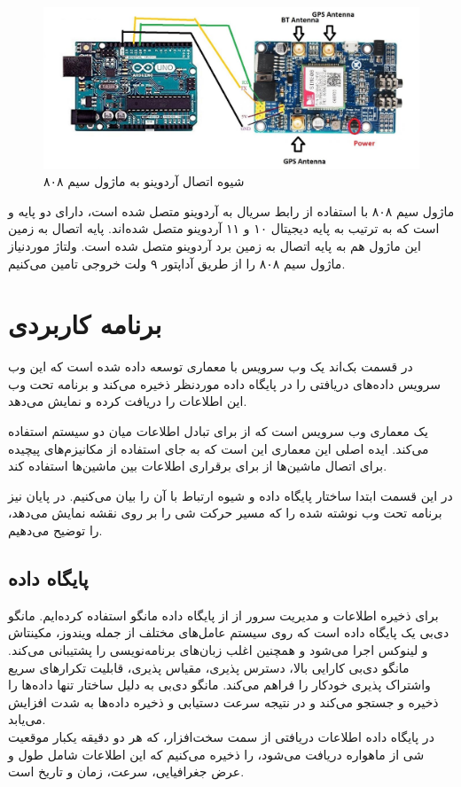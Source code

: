 \begin{figure}[!h]
	\centerline{\includegraphics[width=.8\textwidth]{sim808-arduino}}
	\caption{شیوه اتصال آردوینو به ماژول سیم ۸۰۸\cite{interface}}
\end{figure}


ماژول سیم ۸۰۸ با استفاده از رابط سریال به آردوینو متصل شده است، دارای دو پایه  و  است که به ترتیب به پایه دیجیتال ۱۰ و ۱۱ آردوینو متصل شده‌اند. پایه اتصال به زمین این ماژول هم به پایه اتصال به زمین برد آردوینو متصل شده است. ولتاژ موردنیاز ماژول سیم ۸۰۸ را از طریق آداپتور ۹ ولت خروجی تامین می‌کنیم. 
\section{برنامه کاربردی}
در قسمت بک‌اند یک وب سرویس با معماری  توسعه داده شده است که این وب سرویس داده‌های دریافتی را در پایگاه داده موردنظر ذخیره می‌کند و برنامه تحت وب این اطلاعات را دریافت کرده و نمایش می‌دهد.


یک معماری وب سرویس است که از  برای تبادل اطلاعات میان دو سیستم استفاده می‌کند. ایده اصلی این معماری این است که به جای استفاده از مکانیزم‌های پیچیده برای اتصال ماشین‌ها از  برای برقراری اطلاعات بین ماشین‌ها استفاده کند.

در این قسمت ابتدا ساختار پایگاه داده و شیوه ارتباط با آن را بیان می‌کنیم. در پایان نیز برنامه تحت وب نوشته شده را که مسیر حرکت شی را بر روی نقشه نمایش می‌دهد، را توضیح می‌دهیم.
\subsection{پایگاه داده}
برای ذخیره اطلاعات و مدیریت سرور از از پایگاه داده مانگو استفاده کرده‌ایم. مانگو دی‌بی یک پایگاه داده  است که روی سیستم عامل‌های مختلف از جمله ویندوز، مکینتاش و لینوکس اجرا می‌شود و همچنین اغلب زبان‌های برنامه‌نویسی را پشتیبانی می‌کند. مانگو دی‌بی کارایی بالا، دسترس پذیری، مقیاس پذیری، قابلیت تکرارهای سریع واشتراک پذیری خودکار را فراهم می‌کند. مانگو دی‌بی به دلیل ساختار  تنها داده‌ها را ذخیره و جستجو می‌کند و در نتیجه سرعت دستیابی و ذخیره داده‌ها به شدت افزایش می‌یابد.
\\
در پایگاه داده اطلاعات دریافتی از سمت سخت‌افزار، که هر دو دقیقه یکبار موقعیت شی از ماهواره دریافت می‌شود، را ذخیره می‌کنیم که این اطلاعات شامل طول و عرض جغرافیایی، سرعت، زمان و تاریخ است.
